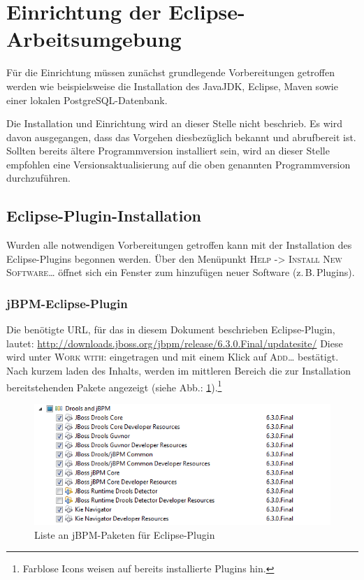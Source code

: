 \section{Einrichtung der Eclipse-Arbeitsumgebung}
Für die Einrichtung müssen zunächst grundlegende Vorbereitungen getroffen werden wie beispielsweise die Installation des JavaJDK, Eclipse, Maven sowie einer lokalen PostgreSQL-Datenbank.

Die Installation und Einrichtung wird an dieser Stelle nicht beschrieb. Es wird davon ausgegangen, dass das Vorgehen diesbezüglich bekannt und abrufbereit ist. Sollten bereits ältere Programmversion installiert sein, wird an dieser Stelle empfohlen eine Versionsaktualisierung auf die oben genannten Programmversion durchzuführen.

\subsection{Eclipse-Plugin-Installation}
Wurden alle notwendigen Vorbereitungen getroffen kann mit der Installation des Eclipse-Plugins begonnen werden. Über den Menüpunkt \textsc{Help -> Install New Software\ldots} öffnet sich ein Fenster zum hinzufügen neuer Software (z.\,B.\,Plugins).

\subsubsection{jBPM-Eclipse-Plugin}
Die benötigte URL, für das in diesem Dokument beschrieben Eclipse-Plugin, lautet: \href{http://downloads.jboss.org/jbpm/release/6.3.0.Final/updatesite/}{http://downloads.jboss.org/jbpm/release/6.3.0.Final/updatesite/}
Diese wird unter \textsc{Work with:} eingetragen und mit einem Klick auf \textsc{Add\ldots} bestätigt. Nach kurzem laden des Inhalts, werden im mittleren Bereich die zur Installation bereitstehenden Pakete angezeigt (siehe Abb.: \ref{fig:install-jbpm-package-list}).\footnote{Farblose Icons weisen auf bereits installierte Plugins hin.}
\begin{figure}[h]
	\centering
	\includegraphics[width=\textwidth]{image/screenshots/install-jbpm-plugin}
	\caption{Liste an jBPM-Paketen für Eclipse-Plugin}\label{fig:install-jbpm-package-list}
\end{figure}